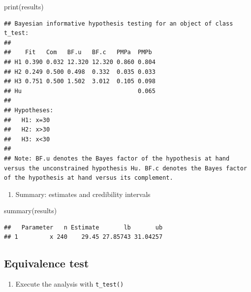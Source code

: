 \documentclass[
]{book}
\newenvironment{Shaded}{\begin{snugshade}}{\end{snugshade}}
\newcommand{\FunctionTok}[1]{\textcolor[rgb]{0.00,0.00,0.00}{#1}}
\newcommand{\NormalTok}[1]{#1}
\providecommand{\tightlist}{%
  \setlength{\itemsep}{0pt}\setlength{\parskip}{0pt}}
\begin{document}
\begin{Shaded}
\begin{Highlighting}[]
\FunctionTok{print}\NormalTok{(results)}
\end{Highlighting}
\end{Shaded}

\begin{verbatim}
## Bayesian informative hypothesis testing for an object of class t_test:
## 
##    Fit   Com   BF.u   BF.c   PMPa  PMPb 
## H1 0.390 0.032 12.320 12.320 0.860 0.804
## H2 0.249 0.500 0.498  0.332  0.035 0.033
## H3 0.751 0.500 1.502  3.012  0.105 0.098
## Hu                                 0.065
## 
## Hypotheses:
##   H1: x=30
##   H2: x>30
##   H3: x<30
## 
## Note: BF.u denotes the Bayes factor of the hypothesis at hand versus the unconstrained hypothesis Hu. BF.c denotes the Bayes factor of the hypothesis at hand versus its complement.
\end{verbatim}

\begin{enumerate}
\def\labelenumi{\arabic{enumi})}
\setcounter{enumi}{3}
\tightlist
\item
  Summary: estimates and credibility intervals
\end{enumerate}

\begin{Shaded}
\begin{Highlighting}[]
\FunctionTok{summary}\NormalTok{(results)}
\end{Highlighting}
\end{Shaded}

\begin{verbatim}
##   Parameter   n Estimate       lb       ub
## 1         x 240    29.45 27.85743 31.04257
\end{verbatim}

\hypertarget{equivalence-test}{%
\subsection{Equivalence test}\label{equivalence-test}}

\begin{enumerate}
\def\labelenumi{\arabic{enumi})}
\tightlist
\item
  Execute the analysis with \texttt{t\_test()}
\end{enumerate}
\end{document}
